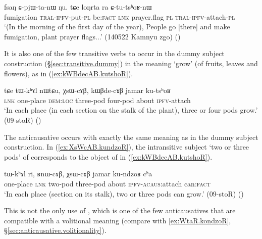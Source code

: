 \begin{exe}
\ex \label{ex:CtutshoRnW}
\gll  fsaŋ ɕ-pjɯ-ta-nɯ ŋu. tɕe loŋrta ra ɕ-tu-tsʰoʁ-nɯ \\
fumigation   \textsc{tral}-\textsc{ipfv}-put-\textsc{pl} be:\textsc{fact} \textsc{lnk} prayer.flag \textsc{pl} \textsc{tral}-\textsc{ipfv}-attach-\textsc{pl} \\
\glt `(In the morning of the first day of the year), People go [there] and make fumigation, plant prayer flags...' (140522 Kamnyu zgo) ()
\end{exe}

It is also one of the few transitive verbs to occur in the dummy subject construction (§\ref{sec:transitive.dummy}) in the meaning `grow' (of fruits, leaves and flowers), as in (\ref{ex:kWBdecAB.kutshoR}).

\begin{exe}
\ex \label{ex:kWBdecAB.kutshoR}
\gll tɕe tɯ-kʰɤl nɯtɕu, χsɯ-cɤβ, kɯβde-cɤβ jamar ku-tsʰoʁ \\
\textsc{lnk} one-place \textsc{dem}:\textsc{loc} three-pod four-pod about \textsc{ipfv}-attach \\
\glt `In each place (in each section on the stalk of the plant), three or four pods grow.' (09-stoR) 
()
\end{exe} 

The anticausative  occurs with exactly the same meaning as  in the dummy subject construction. In (\ref{ex:XsWcAB.kundzoR}), the intransitive subject  `two or three pods' of  corresponds to the object  of  in (\ref{ex:kWBdecAB.kutshoR}).

\begin{exe}
\ex \label{ex:XsWcAB.kundzoR}
\gll tɯ-kʰɤl ri, ʁnɯ-cɤβ, χsɯ-cɤβ jamar ku-ndzoʁ cʰa \\
one-place \textsc{lnk} two-pod  three-pod about \textsc{ipfv}-\textsc{acaus}:attach can:\textsc{fact} \\
\glt `In each place (section on its stalk), two or three pods can grow.' (09-stoR)
()
\end{exe}

This is not the only use of , which is one of the few anticausatives that are compatible with a volitional meaning (compare with \ref{ex:WtaR.kondzoR}, §\ref{sec:anticausative.volitionality}).



